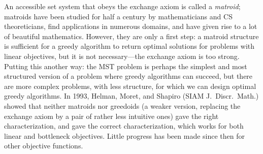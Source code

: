 \documentclass[11pt]{article}
\begin{document}
An accessible set system that obeys the exchange axiom is called a
\emph{matroid}; matroids have been studied for half a century by mathematicians
and CS theoreticians, find applications in numerous domains, and have given
rise to a lot of beautiful mathematics.  However, they are only a first step: a
matroid structure is sufficient for a greedy algorithm to return optimal
solutions for problems with linear objectives, but it is not necessary---the
exchange axiom is too strong.  Putting this another way: the MST problem is
perhaps the simplest and most structured version of a problem where greedy
algorithms can succeed, but there are more complex problems, with less
structure, for which we can design optimal greedy algorithms.  In 1993,
Helman, Moret, and Shapiro (SIAM J.\ Discr.\ Math.) showed that neither
matroids nor greedoids (a weaker version, replacing the exchange axiom by a
pair of rather less intuitive ones) gave the right characterization, and gave
the correct characterization, which works for both linear and bottleneck
objectives.
Little progress has been made since then for other objective functions.
\end{document}

